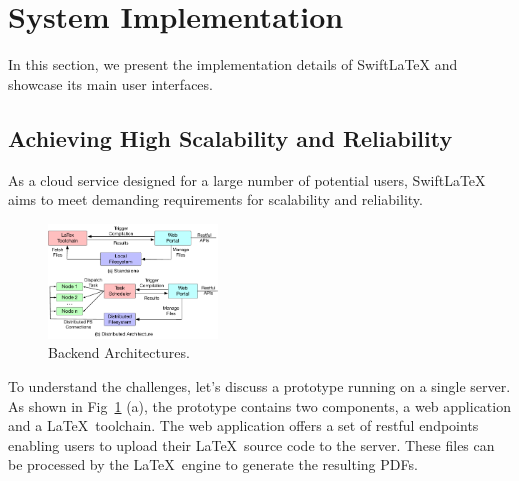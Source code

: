 \documentclass[sigconf]{acmart}
\begin{document}










\section{System Implementation}\label{sect:imp}
In this section, we present the implementation details of SwiftLaTeX and showcase its main user interfaces.

\subsection{Achieving High Scalability and Reliability}
As a cloud service designed for a large number of potential users, SwiftLaTeX aims to meet demanding requirements for scalability and reliability.

\begin{figure}[t]
\begin{center}
\includegraphics[width=0.40\textwidth]{figure/cloudarchitecture}
\caption{Backend Architectures.}
\label{fig:cloudarch}
\end{center}

\end{figure}


To understand the challenges, let's discuss a prototype running on a single server.
 As shown in Fig~\ref{fig:cloudarch} (a), the prototype contains two components, a web application and a \LaTeX\ toolchain. The web application offers a set of restful endpoints enabling users to upload their \LaTeX\ source code to the server. 
 These files can be processed by the \LaTeX\ engine to generate the resulting PDFs. 
\end{document}

